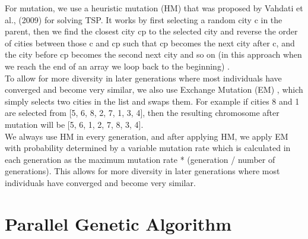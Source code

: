 \documentclass[10pt,journal,compsoc]{IEEEtran}
\begin{document}
For mutation, we use a heuristic mutation (HM) that was proposed by Vahdati et al., (2009) for solving TSP. It works by first selecting a random city c in the parent, then we find the closest city cp to the selected city and reverse the order of cities between those c and cp such that cp becomes the next city after c, and the city before cp becomes the second next city and so on (in this approach when we reach the end of an array we loop back to the beginning) \cite{vahdati2009new}.\\
To allow for more diversity in later generations where most individuals have converged and become very similar, we also use Exchange Mutation (EM) \cite{larranaga1999genetic}, which simply selects two cities in the list and swaps them. For example if cities 8 and 1 are selected from [5, 6, 8, 2, 7, 1, 3, 4], then the resulting chromosome after mutation will be [5, 6, 1, 2, 7, 8, 3, 4].\\  
We always use HM in every generation, and after applying HM, we apply EM with probability determined by a variable mutation rate which is calculated in each generation as the maximum mutation rate * (generation / number of generations). This allows for more diversity in later generations where most individuals have converged and become very similar.

\section{Parallel Genetic Algorithm}
\end{document}
